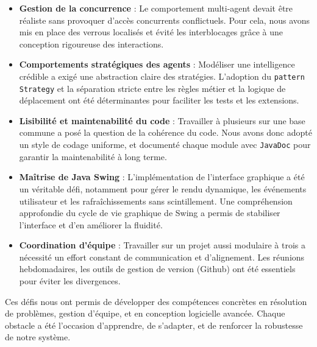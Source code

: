 \begin{itemize}
    
    
    \item \textbf{Gestion de la concurrence} : Le comportement multi-agent devait être réaliste sans provoquer d’accès concurrents conflictuels. Pour cela, nous avons mis en place des verrous localisés et évité les interblocages grâce à une conception rigoureuse des interactions.
    
    \item \textbf{Comportements stratégiques des agents} : Modéliser une intelligence crédible a exigé une abstraction claire des stratégies. L’adoption du \texttt{pattern Strategy} et la séparation stricte entre les règles métier et la logique de déplacement ont été déterminantes pour faciliter les tests et les extensions.
    
    \item \textbf{Lisibilité et maintenabilité du code} : Travailler à plusieurs sur une base commune a posé la question de la cohérence du code. Nous avons donc adopté un style de codage uniforme, et documenté chaque module avec \texttt{JavaDoc} pour garantir la maintenabilité à long terme.
    
    \item \textbf{Maîtrise de Java Swing} : L’implémentation de l’interface graphique a été un véritable défi, notamment pour gérer le rendu dynamique, les événements utilisateur et les rafraîchissements sans scintillement. Une compréhension approfondie du cycle de vie graphique de Swing a permis de stabiliser l’interface et d’en améliorer la fluidité.
    
    \item \textbf{Coordination d'équipe} : Travailler sur un projet aussi modulaire à trois a nécessité un effort constant de communication et d’alignement. Les réunions hebdomadaires, les outils de gestion de version (Github) ont été essentiels pour éviter les divergences.
\end{itemize}

Ces défis nous ont permis de développer des compétences concrètes en résolution de problèmes, gestion d'équipe, et en conception logicielle avancée. Chaque obstacle a été l’occasion d’apprendre, de s’adapter, et de renforcer la robustesse de notre système.
